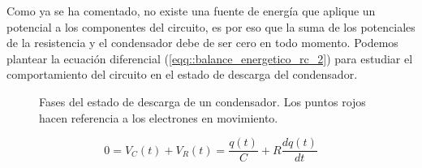 \documentclass[../main.tex]{subfiles}
\begin{document}
Como ya se ha comentado, no existe una fuente de energía que aplique un potencial a los componentes del circuito, es por eso que la suma de los potenciales de la resistencia y el condensador debe de ser cero en todo momento. Podemos plantear la ecuación diferencial (\ref{eqq::balance_energetico_rc_2}) para estudiar el comportamiento del circuito en el estado de descarga del condensador.\\


\begin{figure}[!h]
    \centering
    \caption{Fases del estado de descarga de un condensador. Los puntos rojos hacen referencia a los electrones en movimiento.}
    \label{fig::descarga_condensador}
\end{figure}

\begin{equation}
    0 = V_C(t) + V_R(t) = \frac{q(t)}{C} + R\frac{d q(t)}{d t}
    \label{eqq::balance_energetico_rc_2}
\end{equation}
\end{document}
